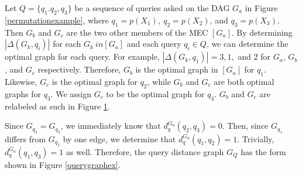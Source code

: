 \begin{example}\label{querydistanceex}
Let $Q = \{q_{1}. q_{2}, q_{3} \}$ be a sequence of queries asked on the DAG $G_{a}$ in Figure \ref{permutationexample}, where $q_{1} = p(X_{1}),\ q_{2} = p(X_{2})$, and $q_{3}=p(X_{3}).$ Then $G_{b}$ and $G_{c}$ are the two other members of the MEC $[G_{a}]$. \newline
\null \quad \quad By determining $|\Delta(G_{k},q_{i})|$ for each $G_{k} \ in [G_{a}]$ and each query $q_{i} \in Q$, we can determine the optimal graph for each query. For example, $|\Delta(G_{k},q_{1})| = 3, 1,$ and $2$ for $G_{a}$, $G_{b}$, and $G_{c}$ respectively. Therefore, $G_{b}$ is the optimal graph in $[G_{a}]$ for $q_{1}$. \newline
\null \quad \quad Likewise, $G_{c}$ is the optimal graph for $q_{2}$, while $G_{b}$ and $G_{c}$ are both optimal graphs for $q_{3}$. We assign $G_{c}$ to be the optimal graph for $q_{3}.$ $G_{b}$ and $G_{c}$ are relabeled as such in Figure \ref{optimalgraphex}.

\begin{figure}[h!]
\begin{center}
\end{center}
\caption{}
\label{optimalgraphex}
\end{figure}

Since $G_{q_{2}} = G_{q_{3}}$, we immediately know that $d_{q}^{G_{a}}(q_{2},q_{3}) = 0.$ Then, since $G_{q_{1}}$ differs from $G_{q_{2}}$ by one edge, we determine that $d_{q}^{G_{a}}(q_{1}, q_{2}) = 1$. Trivially, $d_{q}^{G_{a}}(q_{1}, q_{3}) = 1$ as well. Therefore, the query distance graph $G_{Q}$ has the form shown in Figure \ref{querygraphex}.



\end{example}
